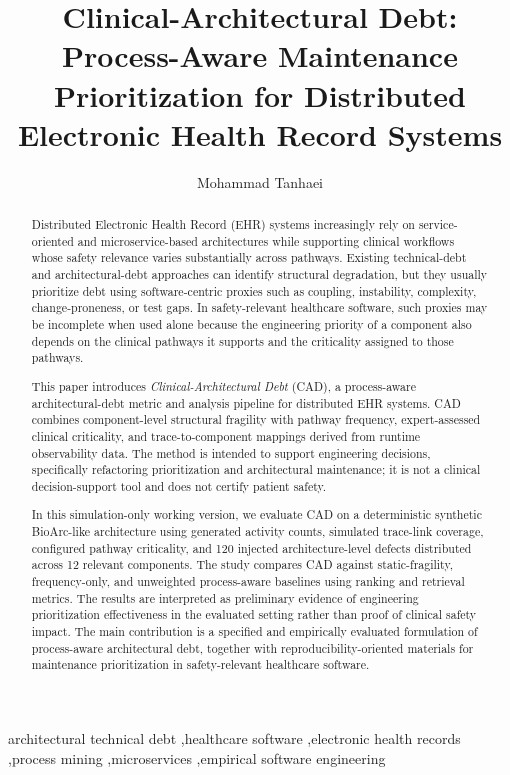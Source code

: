\documentclass[english,preprint]{elsarticle}
\newcommand{\CAD}{\textsc{CAD}\xspace}
\begin{document}
\begin{frontmatter}

\title{Clinical-Architectural Debt: Process-Aware Maintenance Prioritization for Distributed Electronic Health Record Systems}

\author[ilam]{Mohammad Tanhaei}
\address[ilam]{Department of Engineering, Ilam University, Ilam, Iran}

\begin{abstract}
Distributed Electronic Health Record (EHR) systems increasingly rely on service-oriented and microservice-based architectures while supporting clinical workflows whose safety relevance varies substantially across pathways. Existing technical-debt and architectural-debt approaches can identify structural degradation, but they usually prioritize debt using software-centric proxies such as coupling, instability, complexity, change-proneness, or test gaps. In safety-relevant healthcare software, such proxies may be incomplete when used alone because the engineering priority of a component also depends on the clinical pathways it supports and the criticality assigned to those pathways.

This paper introduces \emph{Clinical-Architectural Debt} (\CAD), a process-aware architectural-debt metric and analysis pipeline for distributed EHR systems. \CAD combines component-level structural fragility with pathway frequency, expert-assessed clinical criticality, and trace-to-component mappings derived from runtime observability data. The method is intended to support engineering decisions, specifically refactoring prioritization and architectural maintenance; it is not a clinical decision-support tool and does not certify patient safety.

In this simulation-only working version, we evaluate \CAD on a deterministic synthetic BioArc-like architecture using generated activity counts, simulated trace-link coverage, configured pathway criticality, and 120 injected architecture-level defects distributed across 12 relevant components. The study compares \CAD against static-fragility, frequency-only, and unweighted process-aware baselines using ranking and retrieval metrics. The results are interpreted as preliminary evidence of engineering prioritization effectiveness in the evaluated setting rather than proof of clinical safety impact. The main contribution is a specified and empirically evaluated formulation of process-aware architectural debt, together with reproducibility-oriented materials for maintenance prioritization in safety-relevant healthcare software.
\end{abstract}

\begin{keyword}
architectural technical debt \sep healthcare software \sep electronic health records \sep process mining \sep microservices \sep empirical software engineering
\end{keyword}

\end{frontmatter}
\end{document}
